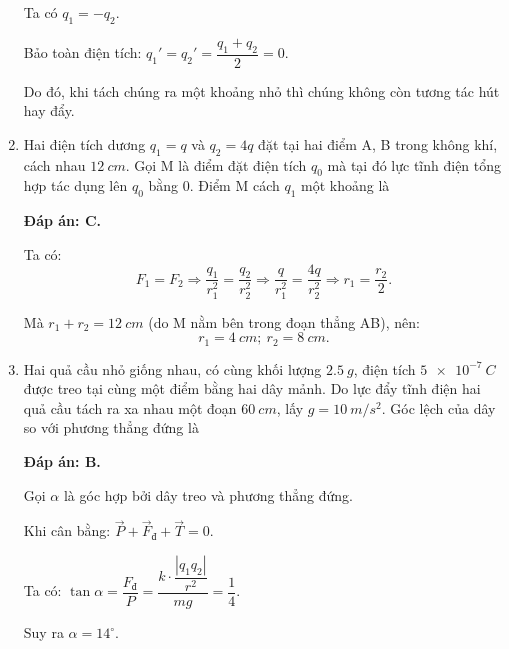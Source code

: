 \begin{enumerate}[label=\bfseries Câu \arabic*:]
{	Ta có $q_1=-q_2$.
	
	Bảo toàn điện tích: $q_1' = q_2' = \dfrac{q_1+q_2}{2} = 0$.
	
	Do đó, khi tách chúng ra một khoảng nhỏ thì chúng không còn tương tác hút hay đẩy.
}
\item {}

\cauhoi
{Hai điện tích dương $q_1=q$ và $q_2=4q$ đặt tại hai điểm A, B trong không khí, cách nhau $\SI{12}{cm}$. Gọi M là điểm đặt điện tích $q_0$ mà tại đó lực tĩnh điện tổng hợp tác dụng lên $q_0$ bằng 0. Điểm M cách $q_1$ một khoảng là
	\begin{mcq}(4)
		\item 8 cm.
		\item 6 cm.
		\item 4 cm.
		\item 3 cm.
	\end{mcq}
	
}
\loigiai
{	\textbf{Đáp án: C.}
	
	Ta có:
	$$F_1 = F_2 \Rightarrow \dfrac{q_1}{r_1^2} = \dfrac{q_2}{r_2^2} \Rightarrow \dfrac{q}{r_1^2} = \dfrac{4q}{r_2^2} \Rightarrow r_1=\dfrac{r_2}{2}.$$
	
	Mà $r_1+r_2=\SI{12}{cm}$ (do M nằm bên trong đoạn thẳng AB), nên:
	$$r_1=\SI{4}{cm};\ r_2=\SI{8}{cm}.$$
}
\item {}

\cauhoi
{Hai quả cầu nhỏ giống nhau, có cùng khối lượng $\SI{2.5}{g}$, điện tích $\SI{5e-7}{C}$ được treo tại cùng một điểm bằng hai dây mảnh. Do lực đẩy tĩnh điện hai quả cầu tách ra xa nhau một đoạn $\SI{60}{cm}$, lấy $g=\SI{10}{m/s^2}$. Góc lệch của dây so với phương thẳng đứng là
	\begin{mcq}(4)
		\item $\alpha = 4^\circ$.
		\item $\alpha = 14^\circ$.
		\item $\alpha = 24^\circ$.
		\item $\alpha = 34^\circ$.
	\end{mcq}
	
}
\loigiai
{	\textbf{Đáp án: B.}
	
	Gọi $\alpha$ là góc hợp bởi dây treo và phương thẳng đứng.
	
	Khi cân bằng: $\vec P + \vec F_\text{đ} + \vec T = 0$.
	
	Ta có: $\tan \alpha = \dfrac{F_\text{đ}}{P} = \dfrac{k \cdot \dfrac{|q_1 q_2|}{r^2}}{mg} = \dfrac{1}{4}$.
	
	Suy ra $\alpha = 14^\circ$.
}
\end{enumerate}

